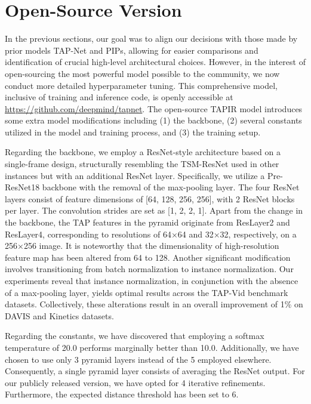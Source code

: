 \documentclass[10pt,twocolumn,letterpaper]{article}
\begin{document}
\section{Open-Source Version}





In the previous sections, our goal was to align our decisions with those made by prior models TAP-Net and PIPs, allowing for easier comparisons and identification of crucial high-level architectural choices. However, in the interest of open-sourcing the most powerful model possible to the community, we now conduct more detailed hyperparameter tuning. This comprehensive model, inclusive of training and inference code, is openly accessible at \href{https://github.com/deepmind/tapnet}{https://github.com/deepmind/tapnet}. The open-source TAPIR model introduces some extra model modifications including (1) the backbone, (2) several constants utilized in the model and training process, and (3) the training setup.

Regarding the backbone, we employ a ResNet-style architecture based on a single-frame design, structurally resembling the TSM-ResNet used in other instances but with an additional ResNet layer. Specifically, we utilize a Pre-ResNet18 backbone with the removal of the max-pooling layer. The four ResNet layers consist of feature dimensions of [64, 128, 256, 256], with 2 ResNet blocks per layer. The convolution strides are set as [1, 2, 2, 1]. Apart from the change in the backbone, the TAP features in the pyramid originate from ResLayer2 and ResLayer4, corresponding to resolutions of 64×64 and 32×32, respectively, on a 256×256 image. It is noteworthy that the dimensionality of high-resolution feature map has been altered from 64 to 128. Another significant modification involves transitioning from batch normalization to instance normalization. Our experiments reveal that instance normalization, in conjunction with the absence of a max-pooling layer, yields optimal results across the TAP-Vid benchmark datasets. Collectively, these alterations result in an overall improvement of 1\% on DAVIS and Kinetics datasets.

Regarding the constants, we have discovered that employing a softmax temperature of 20.0 performs marginally better than 10.0. Additionally, we have chosen to use only 3 pyramid layers instead of the 5 employed elsewhere. Consequently, a single pyramid layer consists of averaging the ResNet output. For our publicly released version, we have opted for 4 iterative refinements. Furthermore, the expected distance threshold has been set to 6.
\end{document}
